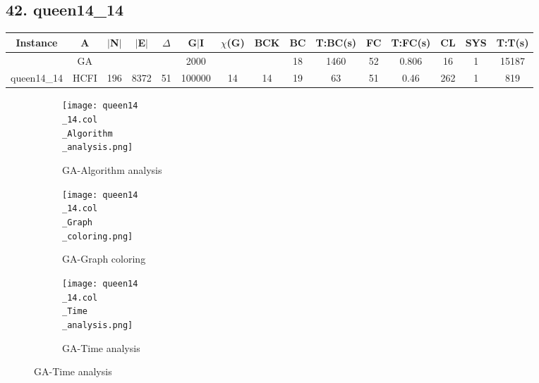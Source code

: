 \documentclass[10pt]{article}
\begin{document}
\subsection*{\hspace{0,9073976cm} 42. queen14\_14 }
\begin{table}[H]
\centering
\begin{tabular}{|c|c|c|c|c|c|c|c|c|c|c|c|c|c|c|}
\hline
Instance& A &$|$N$|$ & $|$E$|$ & $\Delta$ & G$|$I & $\chi$(G) &BCK&BC & T:BC(s) & FC & T:FC(s) & CL & SYS & T:T(s) \\ \hline \hline

&GA&       &                   &                     &    2000     &     \cellcolor{yellow} & {\cellcolor{yellow}}& {{\cellcolor{green}18}}
&1460   &52        &0.806                   & 16                   &1          &15187         \\ \cline{2-2} \cline{6-6} \cline{9-15}
 \multirow{-2}{*}{queen14\_14} &HCFI   &\multirow{-2}{*}{196}   &\multirow{-2}{*}{8372}     &\multirow{-2}{*}{51}     &100000     &\multirow{-2}{*}{\cellcolor{yellow}14}      & \multirow{-2}{*}{\cellcolor{yellow}14}    &{\cellcolor{green}19}     &63         &51    &0.46         &262    &1     &819        \\ \hline
\end{tabular}
\end{table}
\graphicspath{{./Core1/Solutions/GA/queen14\_14.col}}
\begin{figure}[H]
\begin{subfigure}{.33\textwidth}
  \centering
  \texttt{[image: queen14\\\_14.col\\\_Algorithm\\\_analysis.png]}
  \caption{GA-Algorithm analysis}
   \label{fig:subfig1}
\end{subfigure}%
\begin{subfigure}{.33\textwidth}
  \centering
  \texttt{[image: queen14\\\_14.col\\\_Graph\\\_coloring.png]}
  \caption{GA-Graph coloring}
  \label{fig:subfig2}
\end{subfigure}
\begin{subfigure}{.33\textwidth}
  \centering
  \texttt{[image: queen14\\\_14.col\\\_Time\\\_analysis.png]}
  \caption{GA-Time analysis}
  \end{subfigure}
\end{figure}
\end{document}
